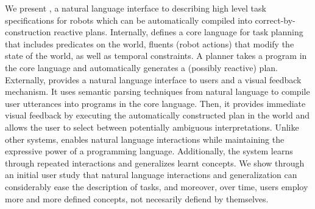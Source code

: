 We present \tool, a natural language interface to describing 
high level task specifications for robots which can be automatically
compiled into correct-by-construction reactive plans.
Internally, \tool defines a core language for task planning that includes
predicates on the world, fluents (robot actions) that modify the state of the world, 
as well as temporal constraints.
A planner takes a program in the core language and automatically generates a (possibly reactive)
plan.
Externally, \tool provides a natural language interface to users and a visual feedback
mechanism.
It uses semantic parsing techniques from natural language to compile user utterances into
programs in the core language.
Then, it provides immediate visual feedback by executing the automatically constructed plan in the world
and allows the user to select between potentially ambiguous interpretations.
Unlike other systems, \tool enables natural language interactions while maintaining the expressive
power of a programming language. 
Additionally, the system learns through repeated interactions and generalizes learnt concepts.
We show through an initial user study that natural language interactions and generalization
can considerably ease the description of tasks, and moreover, over time,
users employ more and more defined concepts, not necesarily defiend by themselves. 
